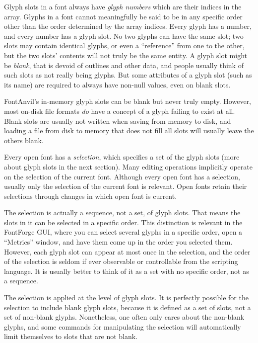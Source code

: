 Glyph slots in a font always have \emph{glyph numbers} which are their
indices in the array.  Glyphs in a font cannot meaningfully be said to be in
any specific order other than the order determined by the array indices. 
Every glyph has a number, and every number has a glyph slot.  No two glyphs
can have the same slot; two slots may contain identical glyphs, or even a
``reference'' from one to the other, but the two slots' contents will not
truly be the same entity.  A glyph slot might be \emph{blank}, that is
devoid of outlines and other data, and people usually think of such slots as
not really being glyphs.  But some attributes of a glyph slot (such as its
name) are required to always have non-null values, even on blank slots.

\begin{framed}
FontAnvil's in-memory glyph slots can be blank but never truly empty. 
However, most on-disk file formats \emph{do} have a concept of a glyph
failing to exist at all.  Blank slots are usually not written when saving
from memory to disk, and loading a file from disk to memory that does not
fill all slots will usually leave the others blank.
\end{framed}

Every open font has a \emph{selection}, which specifies a set of the glyph
slots (more about glyph slots in the next section).  Many editing operations
implicitly operate on the selection of the current font.  Although every
open font has a selection, usually only the selection of the current font is
relevant.  Open fonts retain their selections through changes in which open
font is current.

The selection is actually a sequence, not a set, of glyph slots.  That means
the slots in it can be selected in a specific order.  This distinction is
relevant in the FontForge GUI, where you can select several glyphs in a
specific order, open a ``Metrics'' window, and have them come up in the
order you selected them.  However, each glyph slot can appear at most once
in the selection, and the order of the selection is seldom if ever
observable or controllable from the scripting language.  It is usually
better to think of it as a set with no specific order, not as a sequence.

The selection is applied at the level of glyph slots.  It is perfectly
possible for the selection to include blank glyph slots, because it is
defined as a set of slots, not a set of non-blank glyphs.  Nonetheless, one
often only cares about the non-blank glyphs, and some commands for
manipulating the selection will automatically limit themselves to slots that
are not blank.

